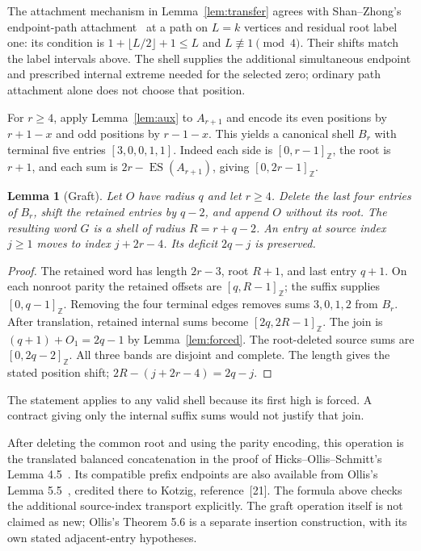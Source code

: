 \documentclass[11pt,a4paper]{article}
\newtheorem{lemma}[theorem]{Lemma}
\theoremstyle{definition}\newtheorem{definition}[theorem]{Definition}
\theoremstyle{remark}\newtheorem{remark}[theorem]{Remark}
\newcommand{\ints}[2]{[#1,#2]_{\mathbb Z}}
\newcommand{\ES}{\operatorname{ES}}
\begin{document}
The attachment mechanism in Lemma~\ref{lem:transfer} agrees with
Shan--Zhong's endpoint-path attachment~\cite[Theorem 2]{sz} at a path
on $L=k$ vertices and residual root label one: its condition is
$1+\lfloor L/2\rfloor+1\le L$ and $L\not\equiv1\pmod4$.
Their shifts match the label intervals above. The shell supplies the
additional simultaneous endpoint and prescribed internal extreme
needed for the selected zero; ordinary path attachment alone does not
choose that position.

For $r\ge4$, apply Lemma~\ref{lem:aux} to $A_{r+1}$ and encode its
even positions by $r+1-x$ and odd positions by $r-1-x$.
This yields a canonical shell $B_r$ with terminal five entries
$[3,0,0,1,1]$. Indeed each side is $\ints0{r-1}$, the root is $r+1$,
and each sum is $2r-\ES(A_{r+1})$, giving $\ints0{2r-1}$.

\begin{lemma}[Graft]\label{lem:graft}
Let $O$ have radius $q$ and let $r\ge4$. Delete the last four entries
of $B_r$, shift the retained entries by $q-2$, and append $O$ without
its root. The resulting word $G$ is a shell of radius $R=r+q-2$.
An entry at source index $j\ge1$ moves to index $j+2r-4$.
Its deficit $2q-j$ is preserved.
\end{lemma}
\begin{proof}
The retained word has length $2r-3$, root $R+1$, and last entry $q+1$.
On each nonroot parity the retained offsets are $\ints q{R-1}$;
the suffix supplies $\ints0{q-1}$. Removing the four terminal edges
removes sums $3,0,1,2$ from $B_r$. After translation, retained internal
sums become $\ints{2q}{2R-1}$. The join is
$(q+1)+O_1=2q-1$ by Lemma~\ref{lem:forced}.
The root-deleted source sums are $\ints0{2q-2}$. All three bands are
disjoint and complete. The length gives the stated position shift;
$2R-(j+2r-4)=2q-j$.
\end{proof}
The statement applies to any valid shell because its first high is
forced. A contract giving only the internal suffix sums would not justify
that join.

After deleting the common root and using the parity encoding, this
operation is the translated balanced concatenation in the proof of
Hicks--Ollis--Schmitt's Lemma 4.5~\cite{hos}. Its compatible prefix
endpoints are also available from Ollis's Lemma 5.5~\cite{ollis},
credited there to Kotzig, reference~[21]. The formula above checks the additional
source-index transport explicitly. The graft operation itself is not
claimed as new; Ollis's Theorem 5.6 is a separate insertion construction,
with its own stated adjacent-entry hypotheses.
\end{document}
